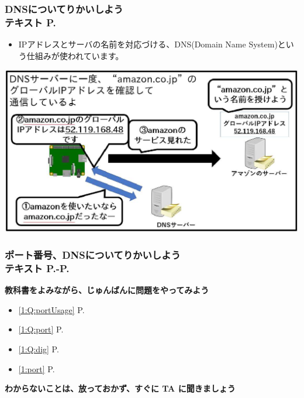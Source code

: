 \begin{frame}[fragile]
	\frametitle{DNSについてりかいしよう\\テキスト P.\pageref{1:P:DNS}~~~}
    \begin{itemize}\small
                \item IPアドレスとサーバの名前を対応づける、DNS(Domain Name System)という仕組みが使われています。
            \end{itemize}
			\begin{minipage}{\textwidth}
                {\upshape
                  \includegraphics[width=\textwidth]{text07-img/ome7-img027}}
            \end{minipage}
\end{frame}




\begin{frame}[fragile]
	\frametitle{\large{ポート番号、DNSについてりかいしよう\\テキスト P.\pageref{1:P:port}-P.\pageref{1:P:HTML}}~~~}
    \large\textbf{教科書をよみながら、じゅんばんに問題をやってみよう}
				\begin{itemize}\small
					\item \ref*{1:Q:portUsage} P.\pageref{1:Q:portUsage}
					\item \ref*{1:Q:port} P.\pageref{1:Q:port}
					\item \ref*{1:Q:dig} P.\pageref{1:Q:dig}
					\item \ref*{1:port} P.\pageref{1:port}
				\end{itemize}
      \vfill
      \large\textbf{わからないことは、放っておかず、すぐに TA に聞きましょう}
\end{frame}







